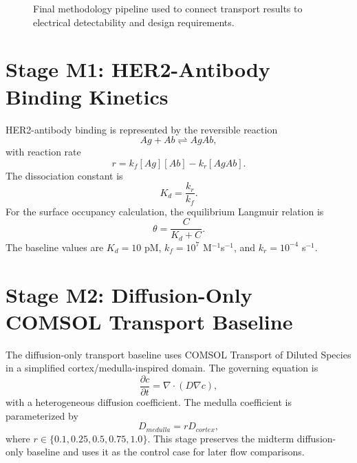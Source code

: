 ﻿\documentclass[12pt,a4paper,oneside]{report}
\begin{document}
\begin{figure}[H]
\centering
{}
\caption{Final methodology pipeline used to connect transport results to electrical detectability and design requirements.}
\label{fig:method_pipeline}
\end{figure}

\section{Stage M1: HER2-Antibody Binding Kinetics}
HER2-antibody binding is represented by the reversible reaction
\begin{equation}
Ag + Ab \rightleftharpoons AgAb,
\end{equation}
with reaction rate
\begin{equation}
r = k_f[Ag][Ab] - k_r[AgAb].
\end{equation}
The dissociation constant is
\begin{equation}
K_d=\frac{k_r}{k_f}.
\end{equation}
For the surface occupancy calculation, the equilibrium Langmuir relation is
\begin{equation}
\theta = \frac{C}{K_d + C}.
\label{eq:occupancy}
\end{equation}
The baseline values are $K_d=10$ pM, $k_f=10^7$ M$^{-1}$s$^{-1}$, and $k_r=10^{-4}$ s$^{-1}$.

\section{Stage M2: Diffusion-Only COMSOL Transport Baseline}
The diffusion-only transport baseline uses COMSOL Transport of Diluted Species in a simplified cortex/medulla-inspired domain. The governing equation is
\begin{equation}
\frac{\partial c}{\partial t}=\nabla\cdot(D\nabla c),
\end{equation}
with a heterogeneous diffusion coefficient. The medulla coefficient is parameterized by
\begin{equation}
D_{medulla}=rD_{cortex},
\end{equation}
where $r\in\{0.1,0.25,0.5,0.75,1.0\}$. This stage preserves the midterm diffusion-only baseline and uses it as the control case for later flow comparisons.
\end{document}
